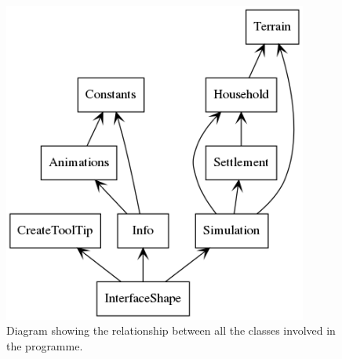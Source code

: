 \documentclass[12pt]{article}
\begin{document}
		\begin{figure}[!htb]
			\includegraphics[width=10cm]{packages}
			\caption{Diagram showing the relationship between all the classes involved in the programme.}
			\label{fig:Packages}
		\end{figure}
		
\end{document}
